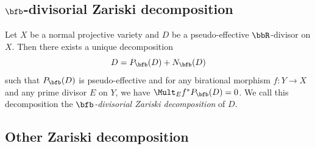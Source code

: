 \subsection[b-divisorial Zariski decomposition]{$\bfb$-divisorial Zariski decomposition}

  \begin{theorem}[{ref.}]
    Let $X$ be a normal projective variety and $D$ be a pseudo-effective $\bbR$-divisor on $X$. Then there exists a unique decomposition
    \[ D = P_\bfb(D) + N_\bfb(D) \]
    such that $P_\bfb(D)$ is pseudo-effective and for any birational morphism $f: Y \to X$ and any prime divisor $E$ on $Y$, we have $\Mult_E f^* P_\bfb(D) = 0$. We call this decomposition the \emph{$\bfb$-divisorial Zariski decomposition} of $D$.
    \Yang{}
  \end{theorem}



\subsection{Other Zariski decomposition}



